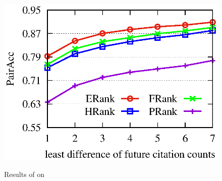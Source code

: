 {\begin{figure}[tb!]
\begin{center}
{\includegraphics[scale=0.42]{./exp/AAN_PairAcc3.eps}}
\hspace{-3ex}
\end{center}
\vspace{-5ex}
\caption{Results of \PairAcc on \aan}
\label{fig-future-period}
\vspace{-2ex}
\end{figure}
\begin{figure}[tb!]
\begin{center}
\end{center}
\end{figure}}
